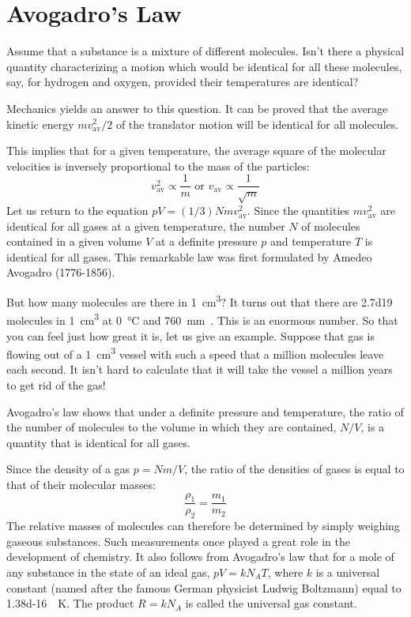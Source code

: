 \section{Avogadro's Law}

Assume that a substance is a mixture of different mole­cules. Isn’t there a physical quantity characterizing a motion which would be identical for all these molecules, say, for hydrogen and oxygen, provided their tempera­tures are identical?

Mechanics yields an answer to this question. It can be proved that the average kinetic energy $mv^{2}_{\textrm{av}}/2$ of the trans­lator motion will be identical for all molecules.

This implies that for a given temperature, the average square of the molecular velocities is inversely proportion­al to the mass of the particles:
\begin{equation*}%
v^{2}_{\textrm{av}} \propto \frac{1}{m} \,\, \text{or} \,\, v_{\textrm{av}} \propto \frac{1}{\sqrt{m}} 
\end{equation*}
Let us return to the equation $pV = (1/3) Nmv^{2}_{\textrm{av}}$. Since the quantities $mv^{2}_{\textrm{av}}$ are identical for all gases at a given temperature, the number $N$ of molecules contained in a given volume $V$ at a definite pressure $p$ and temperature $T$ is identical for all gases. This remarkable law was first formulated by Amedeo Avogadro (1776-1856).

But how many molecules are there in \SI{1}{\centi\meter\cubed}? It turns out that there are \num{2.7d19} molecules in \SI{1}{\centi\meter\cubed} at \SI{0}{\celsius} and \SI{760}{\milli\meter\mercury}. This is an enormous number. So that you can feel just how great it is, let us give an example. Suppose that gas is flowing out of a \SI{1}{\centi\meter\cubed} vessel with such a speed that a million molecules leave each second. It isn’t hard to calculate that it will take the vessel a million years to get rid of the gas!

Avogadro’s law shows that under a definite pressure and temperature, the ratio of the number of molecules to the volume in which they are contained, $N/V$, is a quan­tity that is identical for all gases.

Since the density of a gas $p = Nm/V$, the ratio of the densities of gases is equal to that of their molecular masses:
\begin{equation*}%
\frac{\rho_{1}}{\rho_{2}} = \frac{m_{1}}{m_{2}}
\end{equation*}
The relative masses of molecules can therefore be determined by simply weighing gaseous substances. Such measurements once played a great role in the development of chemistry. It also follows from Avogadro’s law that for a mole of any substance in the state of an ideal gas, $pV = kN_{A}T$, where $k$ is a universal constant (named after the famous German physicist Ludwig Boltzmann) equal to \SI{1.38d-16}{\erg\kelvin}. The product $R = kN_{A}$ is called the universal gas constant.

